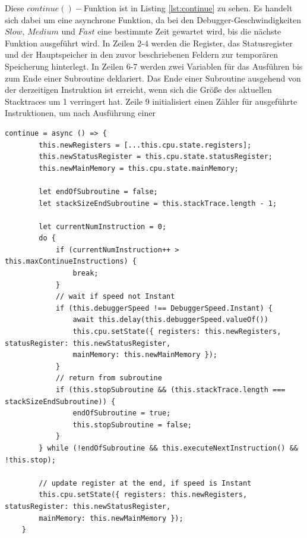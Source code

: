 \documentclass[a4paper, 11pt, onecolumn]{article}
\begin{document}
Diese $continue()-$Funktion ist in Listing \ref{lst:continue} zu sehen. Es handelt sich dabei um eine asynchrone Funktion, da bei den Debugger-Geschwindigkeiten $Slow$, $Medium$ und $Fast$ eine bestimmte Zeit gewartet wird, bis die nächste Funktion ausgeführt wird. In Zeilen 2-4 werden die Register, das Statusregister und der Hauptspeicher in den zuvor beschriebenen Feldern zur temporären Speicherung hinterlegt. In Zeilen 6-7 werden zwei Variablen für das Ausführen bis zum Ende einer Subroutine deklariert. Das Ende einer Subroutine ausgehend von der derzeitigen Instruktion ist erreicht, wenn sich die Größe des aktuellen Stacktraces um 1 verringert hat. Zeile 9 initialisiert einen Zähler für ausgeführte Instruktionen, um nach Ausführung einer

\begin{lstlisting}[style=JavaScript, basicstyle=\footnotesize, backgroundcolor=\color{backcolour}, caption={Continue-Funktion der Code Execution Engine}, captionpos=b, label={lst:continue}]
continue = async () => {
        this.newRegisters = [...this.cpu.state.registers];
        this.newStatusRegister = this.cpu.state.statusRegister;
        this.newMainMemory = this.cpu.state.mainMemory;

        let endOfSubroutine = false;
        let stackSizeEndSubroutine = this.stackTrace.length - 1;

        let currentNumInstruction = 0;
        do {
            if (currentNumInstruction++ > this.maxContinueInstructions) {
                break;
            }
            // wait if speed not Instant
            if (this.debuggerSpeed !== DebuggerSpeed.Instant) {
                await this.delay(this.debuggerSpeed.valueOf())
                this.cpu.setState({ registers: this.newRegisters, statusRegister: this.newStatusRegister,
                mainMemory: this.newMainMemory });
            }
            // return from subroutine
            if (this.stopSubroutine && (this.stackTrace.length === stackSizeEndSubroutine)) {
                endOfSubroutine = true;
                this.stopSubroutine = false;
            }
        } while (!endOfSubroutine && this.executeNextInstruction() && !this.stop);

        // update register at the end, if speed is Instant
        this.cpu.setState({ registers: this.newRegisters, statusRegister: this.newStatusRegister,
        mainMemory: this.newMainMemory });
    }      	 
\end{lstlisting}
\noindent
\end{document}
